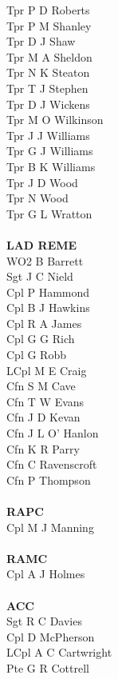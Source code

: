 \begin{multicols}{4}
  Tpr P D Roberts \\
  Tpr P M Shanley \\
  Tpr D J Shaw \\
  Tpr M A Sheldon \\
  Tpr N K Steaton \\
  Tpr T J Stephen \\
  Tpr D J Wickens \\
  Tpr M O Wilkinson \\
  Tpr J J Williams \\
  Tpr G J Williams \\
  Tpr B K Williams \\
  Tpr J D Wood \\
  Tpr N Wood \\
  Tpr G L Wratton \\
  \\
  \textbf{LAD REME} \\
  WO2 B Barrett \\
  Sgt J C Nield \\
  Cpl P Hammond \\
  Cpl B J Hawkins \\
  Cpl R A James \\
  Cpl G G Rich \\
  Cpl G Robb \\
  LCpl M E Craig \\
  Cfn S M Cave \\
  Cfn T W Evans \\
  Cfn J D Kevan \\
  Cfn J L O' Hanlon \\
  Cfn K R Parry \\
  Cfn C Ravenscroft \\
  Cfn P Thompson \\
  \\
  \textbf{RAPC} \\
  Cpl M J Manning \\
  \\
  \textbf{RAMC} \\
  Cpl A J Holmes \\
  \\
  \textbf{ACC} \\
  Sgt R C Davies \\
  Cpl D McPherson \\
  LCpl A C Cartwright \\
  Pte G R Cottrell
\end{multicols}

\pagebreak
